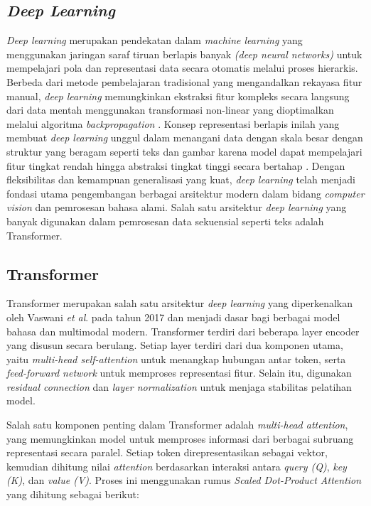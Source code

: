 \subsection{\textit{Deep Learning}} \label{II.teori1}
\textit{Deep learning} merupakan pendekatan dalam \textit{machine learning} yang menggunakan jaringan saraf tiruan berlapis banyak \textit{(deep neural networks)} untuk mempelajari pola dan representasi data secara otomatis melalui proses hierarkis. Berbeda dari metode pembelajaran tradisional yang mengandalkan rekayasa fitur manual, \textit{deep learning} memungkinkan ekstraksi fitur kompleks secara langsung dari data mentah menggunakan transformasi non-linear yang dioptimalkan melalui algoritma \textit{backpropagation} \cite{lecun2015deep}. Konsep representasi berlapis inilah yang membuat \textit{deep learning} unggul dalam menangani data dengan skala besar dengan struktur yang beragam seperti teks dan gambar karena model dapat mempelajari fitur tingkat rendah hingga abstraksi tingkat tinggi secara bertahap \cite{schmidhuber2015deep}. Dengan fleksibilitas dan kemampuan generalisasi yang kuat, \textit{deep learning} telah menjadi fondasi utama pengembangan berbagai arsitektur modern dalam bidang \textit{computer vision} dan pemrosesan bahasa alami. Salah satu arsitektur \textit{deep learning} yang banyak digunakan dalam pemrosesan data sekuensial seperti teks adalah Transformer.


\subsection{Transformer} \label{II.teori4}
Transformer merupakan salah satu arsitektur \textit{deep learning} yang diperkenalkan oleh Vaswani \textit{et al}. pada tahun 2017 dan menjadi dasar bagi berbagai model bahasa dan multimodal modern. Transformer terdiri dari beberapa layer encoder yang disusun secara berulang. Setiap layer terdiri dari dua komponen utama, yaitu \textit{multi-head self-attention} untuk menangkap hubungan antar token, serta \textit{feed-forward network} untuk memproses representasi fitur. Selain itu, digunakan \textit{residual connection} dan \textit{layer normalization} untuk menjaga stabilitas pelatihan model.

Salah satu komponen penting dalam Transformer adalah \textit{multi-head attention}, yang memungkinkan model untuk memproses informasi dari berbagai subruang representasi secara paralel. Setiap token direpresentasikan sebagai vektor, kemudian dihitung nilai \textit{attention} berdasarkan interaksi antara \textit{query (Q)}, \textit{key (K)}, dan \textit{value (V)}. Proses ini menggunakan rumus \textit{Scaled Dot-Product Attention} yang dihitung sebagai berikut:

